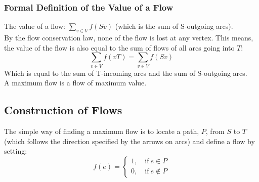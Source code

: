 \subsubsection{Formal Definition of the Value of a Flow}
The value of a flow: $\displaystyle \sum_{v \in V} f(Sv)$ (which is the sum of S-outgoing arcs).\\

By the flow conservation law, none of the flow is lost at any vertex. This means, the value of the flow is also equal to the sum of flows of all arcs going into $T$: 
\[\sum_{v \in V} f(vT) = \sum_{v \in V} f(Sv) \]
Which is equal to the sum of T-incoming arcs and the sum of S-outgoing arcs.\\

A maximum flow is a flow of maximum value.

\subsection{Construction of Flows}
The simple way of finding a maximum flow is to locate a path, $P$, from $S$ to $T$ (which follows the direction specified by the arrows on arcs) and define a flow by setting:
\[ f(e) = \begin{cases}
    1, \quad \mathrm{if\ } e \in P \\
    0, \quad \mathrm{if\ } e \notin P
\end{cases} \]

